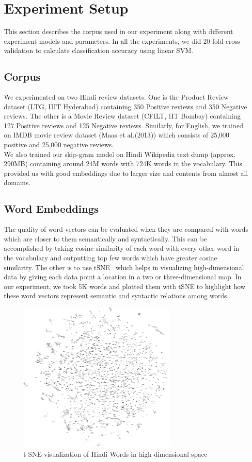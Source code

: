 \def\DevnagVersion{2.15}\documentclass[11pt]{article}
\begin{document}
\section{Experiment Setup}
This section describes the corpus used in our experiment along with different experiment models and parameters. In all the experiments, we did 20-fold cross validation to calculate classification accuracy using linear SVM.
\subsection{Corpus}
We experimented on two Hindi review datasets. One is the Product Review dataset (LTG, IIIT Hyderabad) containing 350 Positive reviews and 350 Negative reviews. The other is a Movie Review dataset (CFILT, IIT Bombay) containing 127 Positive reviews and 125 Negative reviews. Similarly, for English, we trained on IMDB movie review dataset (Maas et al.(2013)) which consists of 25,000 positive and 25,000 negative reviews.\\
We also trained our skip-gram model on Hindi Wikipedia text dump (approx. 290MB) containing around 24M words with 724K words in the vocabulary. This provided us with good embeddings due to larger size and contents from almost all domains.

\subsection{Word Embeddings}
The quality of word vectors can be evaluated when they are compared with words which are closer to them semantically and syntactically. This can be accomplished by taking cosine similarity of each word with every other word in the vocabulary and outputting top few words which have greater cosine similarity. The other is to use tSNE~\cite{Maaten:08} which helps in visualizing high-dimensional data by giving each data point a location in a two or three-dimensional map. In our experiment, we took 5K words and plotted them with tSNE to highlight how these word vectors represent semantic and syntactic relations among words.

\begin{figure}[ht!]
\centering
\includegraphics[width=80mm]{tsne.pdf}
\caption{t-SNE visualization of Hindi Words in high dimensional space \label{fig:5K_hindi_zoom}}
\end{figure}
\end{document}
